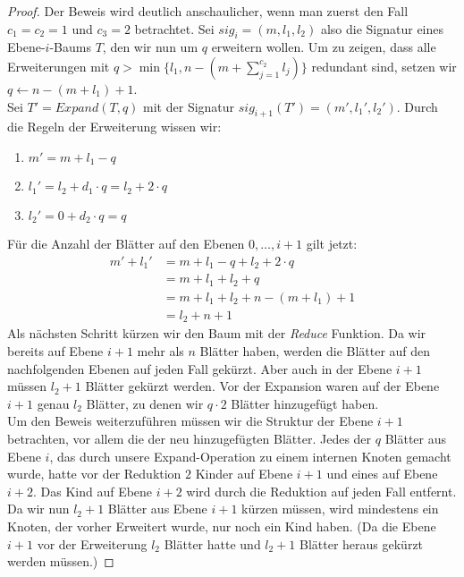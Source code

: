 \documentclass[a4paper,10pt,ngerman]{scrartcl}
\begin{document}
    \begin{proof}
        Der Beweis wird deutlich anschaulicher, wenn man zuerst den Fall $c_1 = c_2 = 1$ und $c_3 = 2$ betrachtet.
        Sei $sig_i = (m, l_1, l_2)$ also die Signatur eines Ebene-$i$-Baums $T$, den wir nun um $q$ erweitern wollen.
        Um zu zeigen, dass alle Erweiterungen mit $q > \min\{l_1, n - (m + \sum^{c_2}_{j=1} l_j)\}$ redundant sind, setzen wir $q \gets n - (m + l_1) + 1$. \\
        Sei $T' = Expand(T, q)$ mit der Signatur $sig_{i+1}(T') = (m', l_1', l_2')$.
        Durch die Regeln der Erweiterung wissen wir:
        \begin{enumerate}
            \item $m' = m + l_1 - q$
            \item $l_1' = l_2 + d_1 \cdot q = l_2 + 2 \cdot q$
            \item $l_2' = 0 + d_2 \cdot q = q$
        \end{enumerate}
        Für die Anzahl der Blätter auf den Ebenen $0, \dots, i + 1$ gilt jetzt:
        \begin{equation}
            \begin{aligned}
                m'+ l_1' &= m + l_1 - q + l_2 + 2 \cdot q\\
                &= m + l_1 + l_2 + q\\
                &= m + l_1 + l_2 + n - (m + l_1) + 1\\
                &= l_2 + n + 1
            \end{aligned}\label{eq:equation}
        \end{equation}
        Als nächsten Schritt kürzen wir den Baum mit der \textit{Reduce} Funktion.
        Da wir bereits auf Ebene $i+1$ mehr als $n$ Blätter haben, werden die Blätter auf den nachfolgenden Ebenen auf jeden Fall gekürzt.
        Aber auch in der Ebene $i + 1$ müssen $l_2 + 1$ Blätter gekürzt werden.
        Vor der Expansion waren auf der Ebene $i + 1$ genau $l_2$ Blätter, zu denen wir $q \cdot 2$ Blätter hinzugefügt haben. \\
        Um den Beweis weiterzuführen müssen wir die Struktur der Ebene $i+1$ betrachten, vor allem die der neu hinzugefügten Blätter.
        Jedes der $q$ Blätter aus Ebene $i$, das durch unsere Expand-Operation zu einem internen Knoten gemacht wurde, hatte vor der Reduktion $2$ Kinder auf Ebene $i + 1$ und eines auf Ebene $i + 2$.
        Das Kind auf Ebene $i + 2$ wird durch die Reduktion auf jeden Fall entfernt.
        Da wir nun $l_2 + 1$ Blätter aus Ebene $i + 1$ kürzen müssen, wird mindestens ein Knoten, der vorher Erweitert wurde, nur noch ein Kind haben. (Da die Ebene $i + 1$ vor der Erweiterung $l_2$ Blätter hatte und $l_2 + 1$ Blätter heraus gekürzt werden müssen.)

\end{proof}
\end{document}

